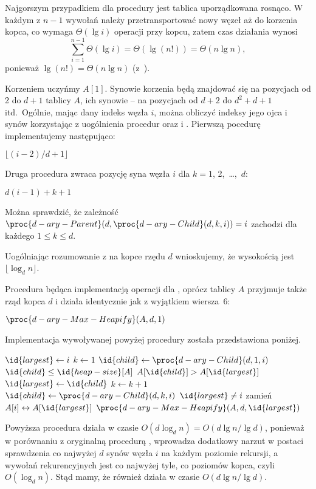 \subproblem %
Najgorszym przypadkiem dla procedury  jest tablica uporządkowana rosnąco. W każdym z $n-1$ wywołań  należy przetransportować nowy węzeł aż do korzenia kopca, co wymaga $\Theta(\lg i)$ operacji przy  kopcu, zatem czas działania  wynosi
\[
	\sum_{i=1}^{n-1}\Theta(\lg i) = \Theta(\lg(n!)) = \Theta(n\lg n),
\]
ponieważ $\lg(n!)=\Theta(n\lg n)$ (z~).


\subproblem %
Korzeniem  uczyńmy $A[1]$. Synowie korzenia będą znajdować się na pozycjach od 2 do $d+1$ tablicy $A$, ich synowie -- na pozycjach od $d+2$ do $d^2+d+1$ itd.\ Ogólnie, mając dany indeks węzła $i$, można obliczyć indeksy jego ojca i synów korzystając z uogólnienia procedur  oraz  i . Pierwszą pocedurę implementujemy następująco:
\begin{codebox}
\li	\Return $\lfloor(i-2)/d+1\rfloor$
\end{codebox}
Druga procedura zwraca pozycję  syna węzła $i$ dla $k=1$, 2,~\dots,~$d$:
\begin{codebox}
\li	\Return $d(i-1)+k+1$
\end{codebox}
Można sprawdzić, że zależność $\proc{d-ary-Parent}(d,\proc{d-ary-Child}(d,k,i))=i$ zachodzi dla każdego $1\le k\le d$.

\subproblem %
Uogólniając rozumowanie z  na kopce rzędu $d$ wnioskujemy, że wysokością  jest $\lfloor\log_dn\rfloor$.

\subproblem %
Procedura  będąca implementacją operacji  dla , oprócz tablicy $A$ przyjmuje także rząd kopca $d$ i działa identycznie jak  z wyjątkiem wiersza~6:
\begin{codebox}
\setcounter{codelinenumber}{5}
\li	$\proc{d-ary-Max-Heapify}(A,d,1)$
\end{codebox}
Implementacja wywoływanej powyżej procedury została przedstawiona poniżej.
\begin{codebox}
\li	$\id{largest}\gets i$
\li	$k\gets1$
\li	$\id{child}\gets\proc{d-ary-Child}(d,1,i)$
\li	\While $\id{child}\le\id{heap-size}[A]$
\li		\Do
			\If $A[\id{child}]>A[\id{largest}]$
\li				\Then $\id{largest}\gets\id{child}$
				\End
\li			$k\gets k+1$
\li			$\id{child}\gets\proc{d-ary-Child}(d,k,i)$
		\End
\li	\If $\id{largest}\ne i$
\li		\Then
			zamień $A[i]\leftrightarrow A[\id{largest}]$
\li			$\proc{d-ary-Max-Heapify}(A,d,\id{largest})$
		\End
\end{codebox}
Powyższa procedura działa w czasie $O(d\log_dn)=O(d\lg n/\!\lg d)$, ponieważ w porównaniu z oryginalną procedurą , wprowadza dodatkowy narzut w postaci sprawdzenia co najwyżej $d$ synów węzła $i$ na każdym poziomie rekursji, a wywołań rekurencyjnych jest co najwyżej tyle, co poziomów kopca, czyli $O(\log_dn)$. Stąd mamy, że również  działa w czasie $O(d\lg n/\!\lg d)$.

